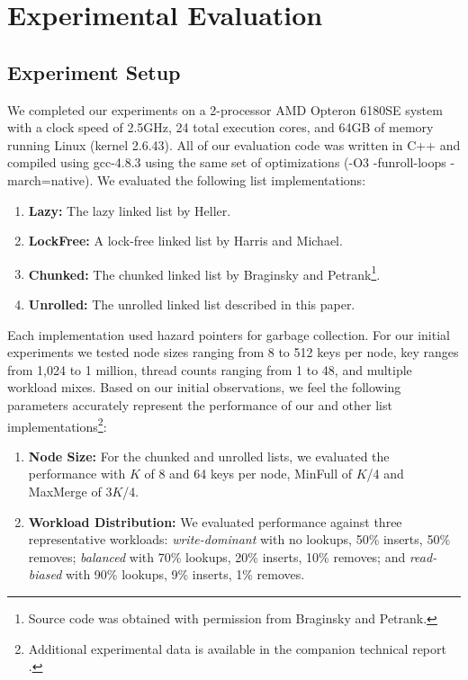 \documentclass{llncs}
\begin{document}
{\section{Experimental Evaluation}\label{Section:Experiments}
\subsection{Experiment Setup}
We completed our experiments on a 2-processor AMD Opteron 6180SE system
with a clock speed of 2.5GHz, 24 total execution cores, and 64GB of memory
running Linux (kernel 2.6.43).  All of our evaluation code was written in
C++ and compiled using gcc-4.8.3 using the same set of 
optimizations (-O3 -funroll-loops -march=native).   
We evaluated the following list implementations:
\begin{enumerate}
\item{\bf Lazy:} The lazy linked list by Heller{\cite{Heller:LazyList}}.
\item{\bf LockFree:} A lock-free linked list by 
Harris\cite{Harris:PragmaticLists} and Michael{\cite{Michael:LFListSets, michael:Hazard}}.
\item{\bf Chunked:} The chunked linked list by Braginsky and 
Petrank{\cite{Braginsky}}\footnote{Source code was obtained 
with permission from Braginsky and Petrank.}.
\item{\bf Unrolled:} The unrolled linked list described in this paper.
\end{enumerate}

Each implementation used hazard pointers for garbage collection.  For our initial
experiments we tested node sizes ranging from 8 to 512 keys per node,  key 
ranges from 1,024 to 1 million, thread counts ranging from 1 to 48, and multiple
workload mixes.  Based on our initial observations, we feel the following parameters
accurately represent the performance of our and other list 
implementations\footnote{Additional experimental data is available in the
companion technical report \cite{Platz:Unrolled}.}:

\begin{enumerate}
\item{\bf Node Size:} For the chunked and unrolled lists, 
we evaluated the performance with $K$ of 8 and 64 keys per node, {\sc MinFull}
of $K$/4 and {\sc MaxMerge} of $3K$/4.
\item{\bf Workload Distribution:} We evaluated performance against three
representative workloads:
{\em write-dominant} with no lookups, 50\% inserts, 50\% removes;
{\em balanced} with 70\% lookups, 20\% inserts, 10\% removes; 
and {\em read-biased} with 90\% lookups, 9\% inserts, 1\% removes.


\end{enumerate}}
\end{document}
